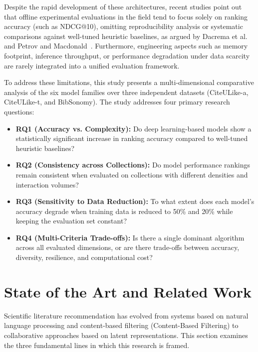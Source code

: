 \documentclass[journal]{IEEEtran}
\makeatletter
\newcommand{\at}[1]{@#1}
\makeatother
\begin{document}
Despite the rapid development of these architectures, recent studies point out that offline experimental evaluations in the field tend to focus solely on ranking accuracy (such as NDCG\at{10}), omitting reproducibility analysis or systematic comparisons against well-tuned heuristic baselines, as argued by Dacrema et al.~\cite{dacrema2019really} and Petrov and Macdonald~\cite{petrov2023effective}. Furthermore, engineering aspects such as memory footprint, inference throughput, or performance degradation under data scarcity are rarely integrated into a unified evaluation framework.

To address these limitations, this study presents a multi-dimensional comparative analysis of the six model families over three independent datasets (CiteULike-a, CiteULike-t, and BibSonomy). The study addresses four primary research questions:

\begin{itemize}
    \item \textbf{RQ1 (Accuracy vs. Complexity):} Do deep learning-based models show a statistically significant increase in ranking accuracy compared to well-tuned heuristic baselines?
    \item \textbf{RQ2 (Consistency across Collections):} Do model performance rankings remain consistent when evaluated on collections with different densities and interaction volumes?
    \item \textbf{RQ3 (Sensitivity to Data Reduction):} To what extent does each model's accuracy degrade when training data is reduced to 50\% and 20\% while keeping the evaluation set constant?
    \item \textbf{RQ4 (Multi-Criteria Trade-offs):} Is there a single dominant algorithm across all evaluated dimensions, or are there trade-offs between accuracy, diversity, resilience, and computational cost?
\end{itemize}

\section{State of the Art and Related Work}
\label{sec:related_work}

Scientific literature recommendation has evolved from systems based on natural language processing and content-based filtering (Content-Based Filtering) to collaborative approaches based on latent representations. This section examines the three fundamental lines in which this research is framed.
\end{document}
